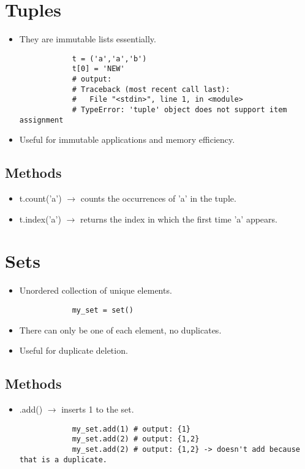 \section{Tuples}
\begin{itemize}
    \item They are immutable lists essentially. 
        \begin{verbatim}
            t = ('a','a','b')
            t[0] = 'NEW'
            # output: 
            # Traceback (most recent call last):
            #   File "<stdin>", line 1, in <module>
            # TypeError: 'tuple' object does not support item assignment
        \end{verbatim}
    \item Useful for immutable applications and memory efficiency.
\end{itemize}
\subsection{Methods}
\begin{itemize}
    \item t.count('a') $\rightarrow$ counts the occurrences of 'a' in the tuple. 
    \item t.index('a') $\rightarrow$ returns the index in which the first time 'a' appears. 
\end{itemize}

\section{Sets}
\begin{itemize}
    \item Unordered collection of unique elements. 
        \begin{verbatim}
            my_set = set()
        \end{verbatim}
    \item There can only be one of each element, no duplicates. 
    \item Useful for duplicate deletion. 
\end{itemize}

\subsection{Methods}
\begin{itemize}
    \item .add() $\rightarrow$ inserts 1 to the set. 
        \begin{verbatim}
            my_set.add(1) # output: {1}
            my_set.add(2) # output: {1,2}
            my_set.add(2) # output: {1,2} -> doesn't add because that is a duplicate. 
        \end{verbatim}
\end{itemize}

